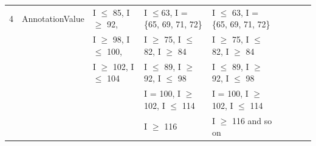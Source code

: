 \begin{table}[!H]
{{\begin{tabular}{|l|l|l|l|l|l|l|l|l|}
4	& AnnotationValue			& I $\le$ 85, I $\ge$ 92, 					& I $\le$63, I = \{65, 69, 71, 72\}					& I $\le$ 63, I = \{65, 69, 71, 72\}							     \\
	&                              			& I $\ge$ 98, I $\le$ 100, 				& I $\ge$ 75, I $\le$ 82, I $\ge$ 84				& I $\ge$ 75, I $\le$ 82, I $\ge$ 84 					    		 \\	
	&                               			& I $\ge$ 102, I $\le$ 104				& I $\le$ 89, I $\ge$ 92, I $\le$ 98				& I $\le$ 89, I $\ge$ 92, I $\le$ 98 							\\	
	&                               			& 										& I = 100, I $\ge$ 102, I $\le$ 114				& I = 100, I $\ge$ 102, I $\le$ 114 							\\	
	&                               			& 										& I $\ge$ 116									& I $\ge$ 116 and so on  										\\	


	
\hline
\end{tabular}
}
}
\label{table:mixDomains}
\end{table}

